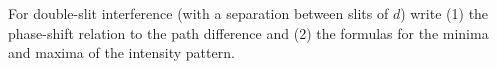 

\vspace*{\fill}
\centering

For double-slit interference (with a separation between slits of $d$) write (1) the phase-shift relation to the path difference and (2) the formulas for the minima and maxima of the intensity pattern.

\centering
\vspace*{\fill}

